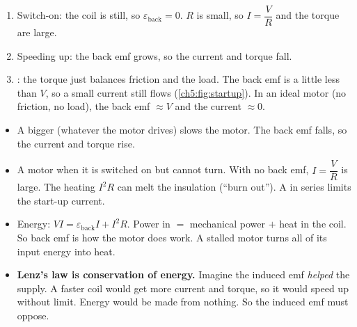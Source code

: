 \begin{sidebyside}[0.40]
  \centering
  \label{ch5:fig:startup}
\nextside
  \begin{enumerate}
    \item Switch-on: the coil is still, so $\varepsilon_\mathrm{back} = 0$. $R$ is
          small, so $I = \dfrac{V}{R}$ and the torque are large.
    \item Speeding up: the back emf grows, so the current and torque fall.
    \item {}: the torque just balances friction and the load. The
          back emf is a little less than $V$, so a small current still flows
          (\cref{ch5:fig:startup}). In an ideal motor (no friction, no load), the back
          emf $\approx V$ and the current $\approx 0$.
  \end{enumerate}
\end{sidebyside}

\begin{itemize}
  \item A bigger  (whatever the motor drives) slows the motor. The back emf
        falls, so the current and torque rise.
  \item A motor  when it is switched on but cannot turn. With no back emf,
        $I = \dfrac{V}{R}$ is large. The heating $I^2R$ can melt the insulation (``burn
        out''). A  in series limits the start-up current.
  \item Energy: $VI = \varepsilon_\mathrm{back}I + I^2R$. Power in $=$ mechanical power
        $+$ heat in the coil. So back emf is how the motor does work. A stalled motor turns
        all of its input energy into heat.
  \item \textbf{Lenz's law is conservation of energy.} Imagine the induced emf
        \emph{helped} the supply. A faster coil would get more current and torque, so it
        would speed up without limit. Energy would be made from nothing. So the induced
        emf must oppose.
\end{itemize}

